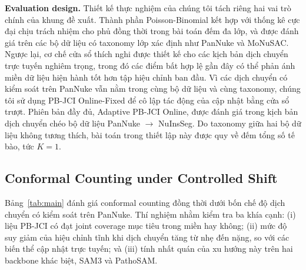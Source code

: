 \documentclass[pdflatex,sn-mathphys-num]{sn-jnl}
\begin{document}
\textbf{Evaluation design.}
Thiết kế thực nghiệm của chúng tôi tách riêng hai vai trò chính của khung đề xuất.
Thành phần Poisson-Binomial kết hợp với thống kê cực đại chịu trách nhiệm cho phủ đồng
thời trong bài toán đếm đa lớp, và được đánh giá trên các bộ dữ liệu có taxonomy lớp xác
định như PanNuke và MoNuSAC. Ngược lại, cơ chế cửa sổ thích nghi được thiết kế cho các
kịch bản dịch chuyển trực tuyến nghiêm trọng, trong đó các điểm bất hợp lệ gần đây có
thể phản ánh miền dữ liệu hiện hành tốt hơn tập hiệu chỉnh ban đầu.
Vì các dịch chuyển có kiểm soát trên PanNuke vẫn nằm trong cùng bộ dữ liệu và cùng
taxonomy, chúng tôi sử dụng PB-JCI Online-Fixed để cô lập tác động của cập nhật bằng
cửa sổ trượt. Phiên bản đầy đủ, Adaptive PB-JCI Online, được đánh giá trong kịch bản
dịch chuyển chéo bộ dữ liệu PanNuke \(\to\) NuInsSeg. Do taxonomy giữa hai bộ dữ
liệu không tương thích, bài toán trong thiết lập này được quy về đếm tổng số tế bào,
tức \(K=1\).

\subsection{Conformal Counting under Controlled Shift}\label{sec:main}

Bảng~\ref{tab:main} đánh giá conformal counting đồng thời dưới bốn chế độ dịch chuyển có
kiểm soát trên PanNuke. Thí nghiệm nhằm kiểm tra ba khía cạnh: (i) liệu PB-JCI có đạt
joint coverage mục tiêu trong miền hay không; (ii) mức độ suy giảm của hiệu chỉnh tĩnh
khi dịch chuyển tăng từ nhẹ đến nặng, so với các biến thể cập nhật trực tuyến; và
(iii) tính nhất quán của xu hướng này trên hai backbone khác biệt, SAM3 và PathoSAM.
\end{document}
